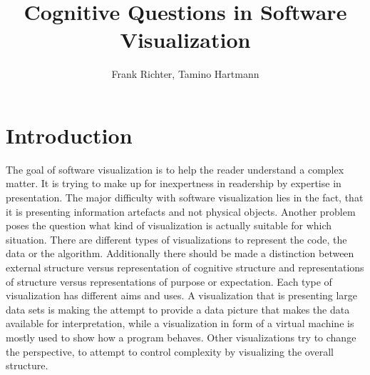\documentclass[11pt, a4paper, ngerman, twoside]{article}
\date{}
\theoremstyle{plain}\newtheorem{Lemma}{Lemma}
\theoremstyle{plain}\newtheorem{Satz}[Lemma]{Satz}
\theoremstyle{definition}\newtheorem{Definition}[Lemma]{Definition}
\theoremstyle{definition}\newtheorem*{Beispiel}{Beispiel}
\theoremstyle{remark}\newtheorem*{Bemerkung}{Bemerkung}
\begin{document}
\title{Cognitive Questions in Software Visualization}
\author{Frank Richter, Tamino Hartmann}

\makeatletter
\let\mytitle\@title
\let\myauthor\@author
\makeatother
\maketitle
\begin{abstract}



\end{abstract}

\section{Introduction}
The goal of software visualization is to help the reader understand a complex matter. It is trying to make up for inexpertness in readership by expertise in presentation. The major difficulty with software visualization lies in the fact, that it is presenting information artefacts and not physical objects. Another problem poses the question what kind of visualization is actually suitable for which situation.
There are different types of visualizations to represent the code, the data or the algorithm\cite{myers}. Additionally there should be made a distinction between external structure versus representation of cognitive structure and representations of structure versus representations of purpose or expectation\cite{origin}.
Each type of visualization has different aims and uses. A visualization that is presenting large data sets is making the attempt to provide a data picture that makes the data available for interpretation, while a visualization in form of a virtual machine is mostly used to show how a program behaves. Other visualizations try to change the perspective, to attempt to control complexity by visualizing the overall structure.
\end{document}
